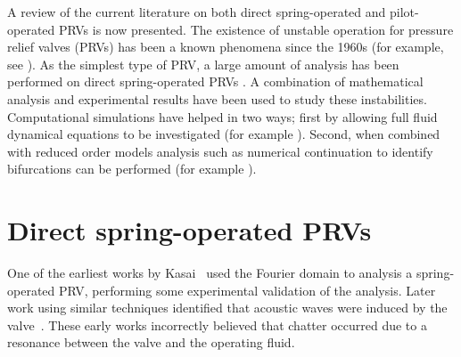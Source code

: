 
% 
A review of the current literature on both direct spring-operated and pilot-operated PRVs is now presented. The existence of unstable operation for pressure relief valves (PRVs) has been a known phenomena since the 1960s (for example, see \cite{Kasai1968OnSystem}).
As the simplest type of  PRV, a large amount of analysis has been performed on direct spring-operated PRVs \cite{Kasai1968OnSystem,Thomann1976OscillationsPipe,Hayashi1995InstabilityCircuit,Darby2013TheModel,Bazso2013AnValve,Erdodi2017PredictionModelling,Hos2015ModelPipe,Hos2017DynamicRecommendations}. A combination of mathematical analysis and experimental results have been used to study these instabilities. Computational simulations have helped  in two ways; first by allowing full fluid dynamical equations
to be investigated (for example \cite{Erdodi2017PredictionModelling,Hos2015ModelPipe}). Second, when combined with reduced order models analysis such as numerical continuation to identify bifurcations can be performed (for example \cite{Hos2015DynamicModelling}).

\section{Direct spring-operated PRVs}

One of the earliest works by Kasai~\cite{Kasai1968OnSystem} used the Fourier domain to analysis a spring-operated PRV, performing some experimental validation of the analysis. Later work using similar techniques identified that acoustic waves were induced by the valve~\cite{Thomann1976OscillationsPipe}. These early works incorrectly believed that chatter occurred due to a resonance between the valve and the operating fluid.

